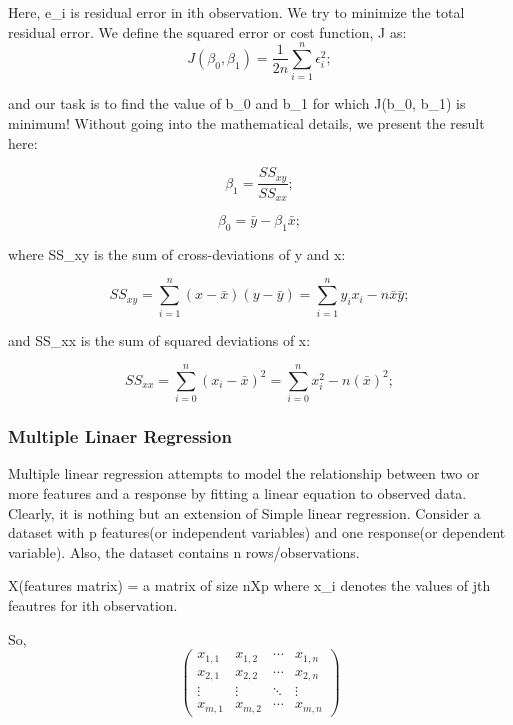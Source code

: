 Here, e\_i is residual error in ith observation.  We try to  minimize the total residual error. We define the squared error or cost function, J as:
\begin{equation}
J(\beta_{0},\beta_{1}) = \frac{1}{2n} \sum_{i=1}^{n} \epsilon_{i}^2;
\end{equation}

and our task is to find the value of b\_0 and b\_1 for which J(b\_0, b\_1) is minimum! Without going into the mathematical details, we present the result here:

\begin{equation}
\beta_{1} = \frac{SS_{xy}}{SS_{xx}};
\end{equation}

\begin{equation}
\beta_{0} =  \bar{y} - \beta_{1}\bar{x};
\end{equation}

where SS\_xy is the sum of cross-deviations of y and x:

\begin{equation}
SS_{xy} = \sum_{i=1}^{n} (x-\bar{x})(y-\bar{y})= \sum_{i=1}^{n} y_{i}x_{i} -n\bar{x}\bar{y};
\end{equation}

and SS\_xx is the sum of squared deviations of x:

\begin{equation}
SS_{xx} = \sum_{i=0}^{n}(x_{i}-\bar{x})^2= \sum_{i=0}^{n} x_{i}^2 - n(\bar{x})^2;
\end{equation}

\subsubsection{Multiple Linaer Regression}
Multiple linear regression attempts to model the relationship between two or more features and a response by fitting a linear equation to observed data. Clearly, it is nothing but an extension of Simple linear regression. Consider a dataset with p features(or independent variables) and one response(or dependent variable). Also, the dataset contains n rows/observations. 

X(features matrix) = a matrix of size nXp where x\_{i} denotes the values of jth feautres for ith observation.
 
So,
$$
\begin{pmatrix}
x_{1,1} & x_{1,2} & \cdots & x_{1,n} \\
x_{2,1} & x_{2,2} & \cdots & x_{2,n} \\
\vdots  & \vdots  & \ddots & \vdots  \\
x_{m,1} & x_{m,2} & \cdots & x_{m,n} 
\end{pmatrix}
$$

